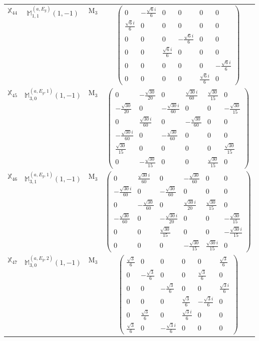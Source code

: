\documentclass[fleqn,10pt,landscape]{article}
\begin{document}
\begin{itemize}
\begin{center}
\begin{longtable}{c|c|c|c}
$ \mathbb{X}_{44} $ & $\mathbb{M}_{1,1}^{(a,E_{g})}(1,-1)$ & M$_{3}$ & $\begin{pmatrix} 0 & - \frac{\sqrt{6} i}{6} & 0 & 0 & 0 & 0 \\ \frac{\sqrt{6} i}{6} & 0 & 0 & 0 & 0 & 0 \\ 0 & 0 & 0 & - \frac{\sqrt{6} i}{6} & 0 & 0 \\ 0 & 0 & \frac{\sqrt{6} i}{6} & 0 & 0 & 0 \\ 0 & 0 & 0 & 0 & 0 & - \frac{\sqrt{6} i}{6} \\ 0 & 0 & 0 & 0 & \frac{\sqrt{6} i}{6} & 0 \end{pmatrix}$ \\
$ \mathbb{X}_{45} $ & $\mathbb{M}_{3,0}^{(a,E_{g},1)}(1,-1)$ & M$_{3}$ & $\begin{pmatrix} 0 & - \frac{\sqrt{30}}{20} & 0 & \frac{\sqrt{30} i}{60} & \frac{\sqrt{30}}{15} & 0 \\ - \frac{\sqrt{30}}{20} & 0 & - \frac{\sqrt{30} i}{60} & 0 & 0 & - \frac{\sqrt{30}}{15} \\ 0 & \frac{\sqrt{30} i}{60} & 0 & - \frac{\sqrt{30}}{60} & 0 & 0 \\ - \frac{\sqrt{30} i}{60} & 0 & - \frac{\sqrt{30}}{60} & 0 & 0 & 0 \\ \frac{\sqrt{30}}{15} & 0 & 0 & 0 & 0 & \frac{\sqrt{30}}{15} \\ 0 & - \frac{\sqrt{30}}{15} & 0 & 0 & \frac{\sqrt{30}}{15} & 0 \end{pmatrix}$ \\
$ \mathbb{X}_{46} $ & $\mathbb{M}_{3,1}^{(a,E_{g},1)}(1,-1)$ & M$_{3}$ & $\begin{pmatrix} 0 & \frac{\sqrt{30} i}{60} & 0 & - \frac{\sqrt{30}}{60} & 0 & 0 \\ - \frac{\sqrt{30} i}{60} & 0 & - \frac{\sqrt{30}}{60} & 0 & 0 & 0 \\ 0 & - \frac{\sqrt{30}}{60} & 0 & \frac{\sqrt{30} i}{20} & \frac{\sqrt{30}}{15} & 0 \\ - \frac{\sqrt{30}}{60} & 0 & - \frac{\sqrt{30} i}{20} & 0 & 0 & - \frac{\sqrt{30}}{15} \\ 0 & 0 & \frac{\sqrt{30}}{15} & 0 & 0 & - \frac{\sqrt{30} i}{15} \\ 0 & 0 & 0 & - \frac{\sqrt{30}}{15} & \frac{\sqrt{30} i}{15} & 0 \end{pmatrix}$ \\
$ \mathbb{X}_{47} $ & $\mathbb{M}_{3,0}^{(a,E_{g},2)}(1,-1)$ & M$_{3}$ & $\begin{pmatrix} \frac{\sqrt{3}}{6} & 0 & 0 & 0 & 0 & \frac{\sqrt{3}}{6} \\ 0 & - \frac{\sqrt{3}}{6} & 0 & 0 & \frac{\sqrt{3}}{6} & 0 \\ 0 & 0 & - \frac{\sqrt{3}}{6} & 0 & 0 & \frac{\sqrt{3} i}{6} \\ 0 & 0 & 0 & \frac{\sqrt{3}}{6} & - \frac{\sqrt{3} i}{6} & 0 \\ 0 & \frac{\sqrt{3}}{6} & 0 & \frac{\sqrt{3} i}{6} & 0 & 0 \\ \frac{\sqrt{3}}{6} & 0 & - \frac{\sqrt{3} i}{6} & 0 & 0 & 0 \end{pmatrix}$ \\

\end{longtable}
\end{center}
\end{itemize}
\end{document}
